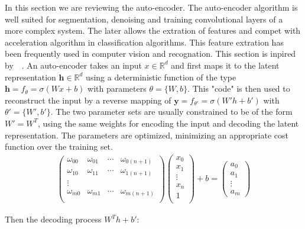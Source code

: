 \documentclass[final, paper=letter,5p,times,twocolumn]{elsarticle}
\begin{document}
In this section we are reviewing the auto-encoder. The auto-encoder algorithm is well suited for segmentation, denoising and training convolutional layers of a more complex system. The later allows the extration of features and compet with acceleration algorithm in classification algorithms. This feature extration has been frequently used in computer vision and recognation. This section is inpired by~\cite{Masci:2011:SCA:2029556.2029563}~\cite{pmid21373993}.
An auto-encoder takes an input $x \in \mathbb{R}^{d}$ and first maps it to the latent representation $\bm{h} \in \mathbb{R}^{d}$ using a deterministic function of the type $\bm{h} = f_{\theta} = \sigma(Wx + b)$ with parameters $\theta = \{W, b\}$. This "code" is then used to reconstruct the input by a reverse mapping of $\bm{y} = f_{\theta'} = \sigma( W'h + b')$ with $\theta' = \{W', b'\}$. The two parameter sets are usually constrained to be of the form $W' = W^{T}$, using the same weights for encoding the input and decoding the latent representation. The parameters are optimized, minimizing an appropriate cost function over the training set.\\

\begin{eqnarray*}
  \left(
  \begin{array}{cccc}
    \omega_{00} & \omega_{01} & \cdots & \omega_{0(n+1)} \\
    \omega_{10} & \omega_{11} & \cdots & \omega_{1(n+1)} \\
    \vdots \\
    \omega_{m0} & \omega_{m1} & \cdots & \omega_{m(n+1)} \\
  \end{array}
  \right) \left(
  \begin{array}{c}
    x_{0} \\
    x_{1} \\
    \vdots \\
    x_{n} \\
    1 \\
  \end{array}
  \right) + b = \left(
  \begin{array}{c}
    a_{0} \\
    a_{1} \\
    \vdots \\
    a_{m} 
  \end{array}
  \right)
\end{eqnarray*}

Then the decoding process $W^{T}h + b'$:
\end{document}
